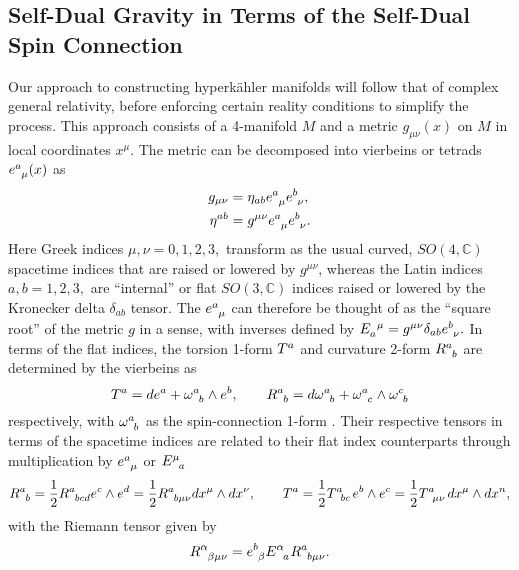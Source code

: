\documentclass[a4paper,12pt, onecolumn, notitlepage]{article}
\theoremstyle{definition}
\theoremstyle{remark}
\newcommand{\al}{\alpha}
\newcommand{\w}{\omega}
\newcommand{\m}{\mu}
\newcommand{\n}{\nu}
\newcommand{\HK}{hyperk\"ahler }
\begin{document}
\subsection{Self-Dual Gravity in Terms of the Self-Dual Spin Connection}
Our approach to constructing \HK manifolds will follow that of complex general relativity, before enforcing certain reality conditions to simplify the process. This approach consists of a 4-manifold $M$ and a metric $g_{\m\n}(x)$ on $M$ in local coordinates $x^{\m}.$ The metric can be decomposed into vierbeins or tetrads $e\indices{^a_\m}(x)$ as
\begin{align*}
	g_{\m\n} &= \eta_{ab}e\indices{^a_\m}e\indices{^b_\n},\\
	\eta^{ab} &= g^{\m\n}e\indices{^a_\m}e\indices{^b_\n}.
\end{align*}
Here Greek indices $\m,\n=0,1,2,3,$ transform as the usual curved, $SO(4,\mathbb{C})$ spacetime indices that  are raised or lowered by $g^{\m\n}$, whereas the Latin indices $a,b=1,2,3,$ are ``internal'' or flat $SO(3,\mathbb{C})$ indices raised or lowered by the Kronecker delta $\delta_{ab}$ tensor. The $e\indices{^a_\m}$ can therefore be thought of as the ``square root'' of the metric $g$ in a sense, with inverses defined by $E\indices{_a^{\m}} = g^{\m\n}\delta_{ab}e\indices{^b_\n}.$ In terms of the flat indices, the torsion 1-form $T\indices{^a}$ and curvature 2-form $R\indices{^a_b}$ are determined by the vierbeins as
\begin{equation*}
	T\indices{^a} = de\indices{^a} + \w\indices{^a_b}\wedge e\indices{^b},\qquad R\indices{^a_b} = d\w\indices{^a_b} + \w\indices{^a_c}\wedge\w\indices{^c_b}
\end{equation*}
respectively, with $\w\indices{^a_b}$ as the spin-connection 1-form \cite{eguchi_1980}. Their respective tensors in terms of the spacetime indices are related to their flat index counterparts through multiplication by $e\indices{^a_\m}$ or $E\indices{^\m_a}$
\begin{equation*}
R\indices{^a_b}=\frac{1}{2}R\indices{^a_b_c_d}e\indices{^c}\wedge e\indices{^d}=\frac{1}{2}R\indices{^a_b_\m_\n}dx\indices{^\m}\wedge dx\indices{^\n},\qquad T\indices{^a} = \frac{1}{2}T\indices{^a_b_c}e\indices{^b}\wedge e\indices{^c}=\frac{1}{2}T\indices{^a_\m_\n}dx\indices{^\m}\wedge dx\indices{^n},
\end{equation*}
with the Riemann tensor given by
\begin{equation*}
	\label{riemann}
	R\indices{^\al_\beta_\mu_\n} = e\indices{^b_\beta}E\indices{^\al_a}R\indices{^a_b_\m_\n}.
\end{equation*}
\end{document}
